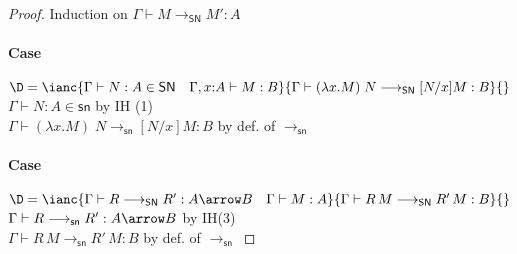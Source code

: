 \documentclass{article}
\newcommand{\SN}{\mathsf{SN}}
\newcommand{\csn}{\mathsf{sn}}
\newcommand{\redsn}{\longrightarrow_\csn}
\newcommand{\redSN}{\longrightarrow_\SN}
\begin{document}
\begin{proof}
Induction on $\Gamma \vdash M \redSN M' : A$

\paragraph{Case}
$\D = \ianc{\Gamma \vdash N : A \in \SN \quad \Gamma, x{:}A \vdash M : B}{\Gamma \vdash (\lambda x.M)\;N \redSN [N/x]M : B}{}$
\\[1em]
$\Gamma \vdash N : A \in \csn$ \hfill by IH (1)\\
$\Gamma \vdash (\lambda x.M)\;N \redsn [N/x]M : B$ \hfill by def. of $\redsn$

\paragraph{Case}
$\D = \ianc{\Gamma \vdash R \redSN R' : A \arrow B \quad \Gamma \vdash M : A}{\Gamma \vdash R\,M \redSN R'\,M : B}{}$
\\[1em]
$\Gamma \vdash R \redsn R' : A \arrow B$ \hfill by IH(3) \\
$\Gamma \vdash  R\,M \redsn R'\,M : B$ \hfill by def. of $\redsn$
\end{proof}






% 

\end{document}
